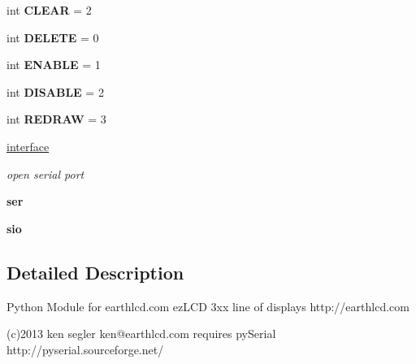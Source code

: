 \begin{DoxyCompactItemize}
\item 
\hypertarget{namespaceez_l_c_d3xx_aaabbbb4a0f7dde06f73c821cbb8c2da9}{int {\bfseries C\-L\-E\-A\-R} = 2}\label{namespaceez_l_c_d3xx_aaabbbb4a0f7dde06f73c821cbb8c2da9}

\item 
\hypertarget{namespaceez_l_c_d3xx_a981026b3a604210e561134ac7b39efbf}{int {\bfseries D\-E\-L\-E\-T\-E} = 0}\label{namespaceez_l_c_d3xx_a981026b3a604210e561134ac7b39efbf}

\item 
\hypertarget{namespaceez_l_c_d3xx_a07b49992c17d8940af6ef3a44070eed6}{int {\bfseries E\-N\-A\-B\-L\-E} = 1}\label{namespaceez_l_c_d3xx_a07b49992c17d8940af6ef3a44070eed6}

\item 
\hypertarget{namespaceez_l_c_d3xx_a0cbf9954056c2191d30aea1a787159d6}{int {\bfseries D\-I\-S\-A\-B\-L\-E} = 2}\label{namespaceez_l_c_d3xx_a0cbf9954056c2191d30aea1a787159d6}

\item 
\hypertarget{namespaceez_l_c_d3xx_a9e1593670c7a175be778fbb563e50b23}{int {\bfseries R\-E\-D\-R\-A\-W} = 3}\label{namespaceez_l_c_d3xx_a9e1593670c7a175be778fbb563e50b23}

\item 
\hypertarget{namespaceez_l_c_d3xx_afcf658508c426a01de8e18e7fb3530ca}{\hyperlink{namespaceez_l_c_d3xx_afcf658508c426a01de8e18e7fb3530ca}{interface}}\label{namespaceez_l_c_d3xx_afcf658508c426a01de8e18e7fb3530ca}

\begin{DoxyCompactList}\small\item\em open serial port \end{DoxyCompactList}\item 
\hypertarget{namespaceez_l_c_d3xx_a11773e4014d1da38ff2a8a46723c5b97}{{\bfseries ser}}\label{namespaceez_l_c_d3xx_a11773e4014d1da38ff2a8a46723c5b97}

\item 
\hypertarget{namespaceez_l_c_d3xx_a945b8f81819428da2c0a1aada626e598}{{\bfseries sio}}\label{namespaceez_l_c_d3xx_a945b8f81819428da2c0a1aada626e598}

\end{DoxyCompactItemize}


\subsection{Detailed Description}
\begin{DoxyVerb}Python Module for earthlcd.com ezLCD 3xx line of displays
http://earthlcd.com

(c)2013 ken segler
ken@earthlcd.com 
requires pySerial http://pyserial.sourceforge.net/
\end{DoxyVerb}
 

